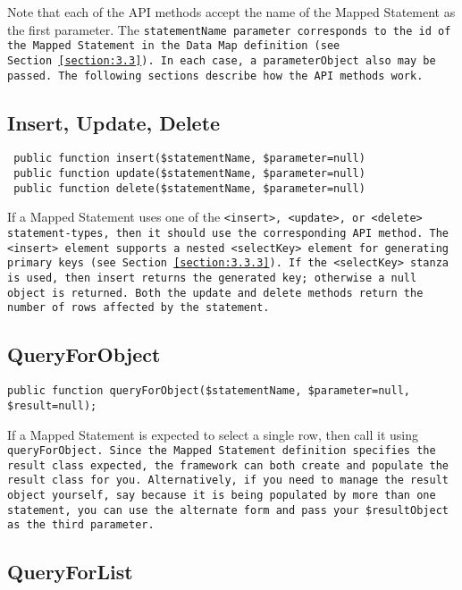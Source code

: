 Note that each of the API methods accept the name of the Mapped Statement as
the first parameter. The \tt{statementName} parameter corresponds to the
\tt{id} of the Mapped Statement in the Data Map definition (see
Section~\ref{section:3.3}). In each case, a \tt{parameterObject} also may be
passed. The following sections describe how the API methods work.

\subsection{Insert, Update, Delete}
\begin{verbatim}
 public function insert($statementName, $parameter=null)
 public function update($statementName, $parameter=null)
 public function delete($statementName, $parameter=null)
\end{verbatim}

If a Mapped Statement uses one of the \tt{<insert>}, \tt{<update>}, or
\tt{<delete>} statement-types, then it should use the corresponding API
method. The \tt{<insert>} element supports a nested \tt{<selectKey>} element
for generating primary keys (see Section~\ref{section:3.3.3}). If the
\tt{<selectKey>} stanza is used, then \tt{insert} returns the generated key;
otherwise a null object is returned. Both the \tt{update} and \tt{delete}
methods return the number of rows affected by the statement.

\subsection{QueryForObject}
\begin{verbatim}
public function queryForObject($statementName, $parameter=null, $result=null);
\end{verbatim}

If a Mapped Statement is expected to select a single row, then call it using
\tt{queryForObject}. Since the Mapped Statement definition specifies the
result class expected, the framework can both create and populate the result
class for you. Alternatively, if you need to manage the result object
yourself, say because it is being populated by more than one statement, you
can use the alternate form and pass your \tt{\$resultObject} as the third
parameter.

\subsection{QueryForList}

